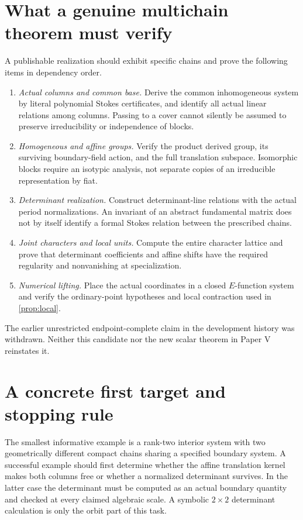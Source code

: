 \documentclass[11pt]{article}
\numberwithin{equation}{section}
\theoremstyle{definition}
\theoremstyle{remark}
\begin{document}
\section{What a genuine multichain theorem must verify}
A publishable realization should exhibit specific chains and prove the
following items in dependency order.
\begin{enumerate}[leftmargin=2em]
\item \emph{Actual columns and common base.} Derive the common inhomogeneous
system by literal polynomial Stokes certificates, and identify all actual
linear relations among columns. Passing to a cover cannot silently be
assumed to preserve irreducibility or independence of blocks.
\item \emph{Homogeneous and affine groups.} Verify the product derived group,
its surviving boundary-field action, and the full translation subspace.
Isomorphic blocks require an isotypic analysis, not separate copies of an
irreducible representation by fiat.
\item \emph{Determinant realization.} Construct determinant-line relations
with the actual period normalizations. An invariant of an abstract
fundamental matrix does not by itself identify a formal Stokes relation
between the prescribed chains.
\item \emph{Joint characters and local units.} Compute the entire character
lattice and prove that determinant coefficients and affine shifts have
the required regularity and nonvanishing at specialization.
\item \emph{Numerical lifting.} Place the actual coordinates in a closed
$E$-function system and verify the ordinary-point hypotheses and local
contraction used in \cref{prop:local}.
\end{enumerate}
The earlier unrestricted endpoint-complete claim in the development
history was withdrawn. Neither this candidate nor the new scalar theorem
in Paper V reinstates it.

\section{A concrete first target and stopping rule}
The smallest informative example is a rank-two interior system with two
geometrically different compact chains sharing a specified boundary
system. A successful example should first determine whether the affine
translation kernel makes both columns free or whether a normalized
determinant survives. In the latter case the determinant must be computed
as an actual boundary quantity and checked at every claimed algebraic
scale. A symbolic $2\times2$ determinant calculation is only the orbit
part of this task.
\end{document}
